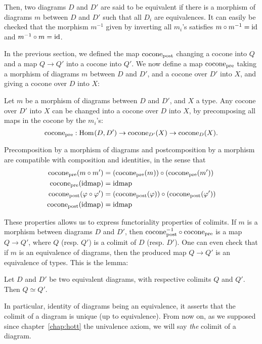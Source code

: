 Then, two diagrams $D$ and $D'$ are said to be equivalent if there is
a morphism of diagrams $m$ between $D$ and $D'$ such that all $D_i$
are equivalences. It can easily be checked that the morphism $m^{-1}$
given by inverting all $m_i$'s satisfies $m\circ m^{-1} = \operatorname{id}$ and
$m^{-1} \circ m = \operatorname{id}$.

In the previous section, we defined the map
$\mathrm{cocone}_{\mathrm{post}}$ changing a cocone into $Q$ and a map
$Q\to Q'$ into a cocone into $Q'$. We now define a map
$\mathrm{cocone}_{\mathrm{pre}}$ taking a morphism of diagrams $m$
between $D$ and $D'$, and a cocone over $D'$ into $X$, and giving a
cocone over $D$ into $X$:
\begin{defi}
  Let $m$ be a morphism of diagrams between $D$ and $D'$, and $X$ a
  type.
  Any cocone over $D'$ into $X$ can be changed into a cocone over $D$
  into $X$, by precomposing all maps in the cocone by the $m_i$'s:
  \[
    \mathrm{cocone}_{\mathrm{pre}} : \mathrm{Hom}_{}(D,D') \to \operatorname{cocone}_{D'}(X) \to \operatorname{cocone}_D(X).
  \]
\end{defi}

Precomposition by a morphism of diagrams and postcomposition by a
morphism are compatible with
composition and identities, in the sense that
\begin{align*}
  \mathrm{cocone}_{\mathrm{pre}} (m\circ m') &= (\mathrm{cocone}_{\mathrm{pre}} (m)) \circ
  (\mathrm{cocone}_{\mathrm{pre}}(m')) \\
  \mathrm{cocone}_{\mathrm{pre}} (\operatorname{\mathrm{idmap}}) &= \operatorname{\mathrm{idmap}} \\
  \mathrm{cocone}_{\mathrm{post}} (\varphi \circ \varphi') &= (\mathrm{cocone}_{\mathrm{post}} (\varphi)) \circ
  (\mathrm{cocone}_{\mathrm{post}} (\varphi')) \\
  \mathrm{cocone}_{\mathrm{post}} (\operatorname{\mathrm{idmap}}) &= \operatorname{\mathrm{idmap}} 
\end{align*}

These properties allows us to express functoriality properties of
colimits. If $m$ is a morphism between diagrams $D$ and $D'$, then
$\mathrm{cocone}_{\mathrm{post}}^{-1} \circ
\mathrm{cocone}_{\mathrm{pre}}$ is a map $Q \to Q'$, where $Q$
(resp. $Q'$) is a colimit of $D$ (resp. $D'$). One can even check that
if $m$ is an equivalence of diagrams, then the produced map $Q\to Q'$
is an equivalence of types. This is the lemma:
\begin{lem}
  Let $D$ and $D'$ be two equivalent diagrams, with respective
  colimits $Q$ and $Q'$. Then $Q\simeq Q'$.
\end{lem}
In particular, identity of diagrams being an equivalence, it asserts
that the colimit of a diagram is unique (up to equivalence). From now
on, as we supposed since chapter~\ref{chap:hott} the univalence axiom,
we will say {\em the} colimit of a diagram.

